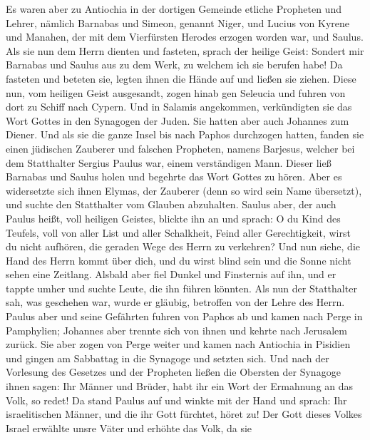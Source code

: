  Es waren aber zu Antiochia in der dortigen Gemeinde
etliche Propheten und Lehrer, nämlich Barnabas und Simeon, genannt
Niger, und Lucius von Kyrene und Manahen, der mit dem Vierfürsten
Herodes erzogen worden war, und Saulus.  Als sie nun dem
Herrn dienten und fasteten, sprach der heilige Geist: Sondert mir
Barnabas und Saulus aus zu dem Werk, zu welchem ich sie berufen habe!
 Da fasteten und beteten sie, legten ihnen die Hände auf
und ließen sie ziehen.  Diese nun, vom heiligen Geist
ausgesandt, zogen hinab gen Seleucia und fuhren von dort zu Schiff nach
Cypern.  Und in Salamis angekommen, verkündigten sie das
Wort Gottes in den Synagogen der Juden. Sie hatten aber auch Johannes
zum Diener.  Und als sie die ganze Insel bis nach Paphos
durchzogen hatten, fanden sie einen jüdischen Zauberer und falschen
Propheten, namens Barjesus,  welcher bei dem Statthalter
Sergius Paulus war, einem verständigen Mann. Dieser ließ Barnabas und
Saulus holen und begehrte das Wort Gottes zu hören.  Aber
es widersetzte sich ihnen Elymas, der Zauberer (denn so wird sein Name
übersetzt), und suchte den Statthalter vom Glauben abzuhalten.
 Saulus aber, der auch Paulus heißt, voll heiligen
Geistes, blickte ihn an  und sprach: O du Kind des
Teufels, voll von aller List und aller Schalkheit, Feind aller
Gerechtigkeit, wirst du nicht aufhören, die geraden Wege des Herrn zu
verkehren?  Und nun siehe, die Hand des Herrn kommt über
dich, und du wirst blind sein und die Sonne nicht sehen eine Zeitlang.
Alsbald aber fiel Dunkel und Finsternis auf ihn, und er tappte umher und
suchte Leute, die ihn führen könnten.  Als nun der
Statthalter sah, was geschehen war, wurde er gläubig, betroffen von der
Lehre des Herrn.  Paulus aber und seine Gefährten fuhren
von Paphos ab und kamen nach Perge in Pamphylien; Johannes aber trennte
sich von ihnen und kehrte nach Jerusalem zurück.  Sie
aber zogen von Perge weiter und kamen nach Antiochia in Pisidien und
gingen am Sabbattag in die Synagoge und setzten sich. 
Und nach der Vorlesung des Gesetzes und der Propheten ließen die
Obersten der Synagoge ihnen sagen: Ihr Männer und Brüder, habt ihr ein
Wort der Ermahnung an das Volk, so redet!  Da stand
Paulus auf und winkte mit der Hand und sprach: Ihr israelitischen
Männer, und die ihr Gott fürchtet, höret zu!  Der Gott
dieses Volkes Israel erwählte unsre Väter und erhöhte das Volk, da sie
